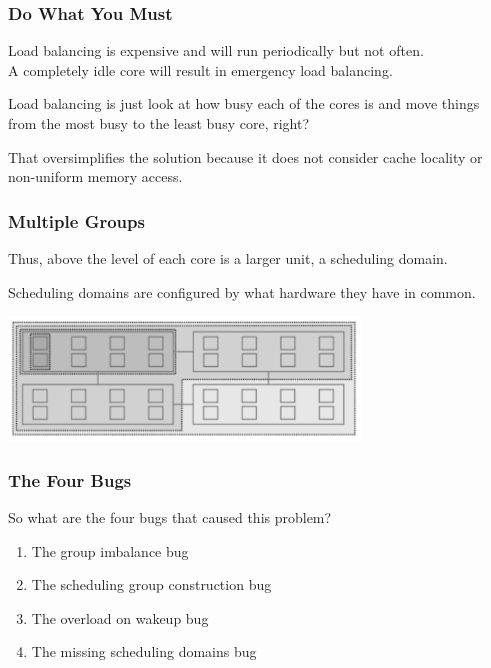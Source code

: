 \begin{frame}
\frametitle{Do What You Must}

Load balancing is expensive and will run periodically but not often.\\
\quad A completely idle core will result in emergency load balancing.

Load balancing is just look at how busy each of the cores is and move things from the most busy to the least busy core, right?

That oversimplifies the solution because it does not consider cache locality or non-uniform memory access.

\end{frame}



\begin{frame}
\frametitle{Multiple Groups}

Thus, above the level of each core is a larger unit, a scheduling domain. 

Scheduling domains are configured by what hardware they have in common.

\begin{center}
	\includegraphics[width=0.7\textwidth]{images/wastedcores.png}\\
\end{center}

\end{frame}



\begin{frame}
\frametitle{The Four Bugs}

So what are the four bugs that caused this problem?
\begin{enumerate}
	\item The group imbalance bug
	\item The scheduling group construction bug
	\item The overload on wakeup bug
	\item The missing scheduling domains bug
\end{enumerate}

\end{frame}



